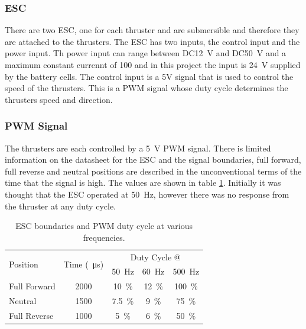 		\subsubsection{ESC}
		There are two ESC, one for each thruster and are submersible and therefore they are attached to the thrusters. The ESC has two inputs, the control input and the power input. Th power input can range between DC\SI{12}{\volt} and DC\SI{50}{\volt} and a maximum constant currennt of \SI{100}{\amp} and in this project the input is \SI{24}{\volt} supplied by the battery cells. The control input is a 5V signal that is used to control the speed of the thrusters. This is a PWM signal whose duty cycle determines the thrusters speed and direction. 
		
		\subsubsection{PWM Signal}
		The thrusters are each controlled by a \SI{5}{\volt} PWM signal. There is limited information on the datasheet for the ESC and the signal boundaries, full forward, full reverse and neutral positions are described in the unconventional terms of the time that the signal is high. The values are shown in table \ref{tab:3:PWM}. Initially it was thought that the ESC operated at \SI{50}{\hertz}, however there was no response from the thruster at any duty cycle.\par
		\begin{table}[!ht]
			\begin{center}
				\caption{ESC boundaries and PWM duty cycle at various frequencies.}
				\label{tab:3:PWM}
				\begin{tabular}{|l|c|c|c|c|}
					\hline
					\multirow{2}{*}{Position} & \multirow{2}{*}{Time (\SI{}{\micro\second})} & \multicolumn{3}{c|}{Duty Cycle @}\\
					& & \multicolumn{1}{c}{\SI{50}{\hertz}} & \multicolumn{1}{c}{\SI{60}{\hertz}} & \multicolumn{1}{c|}{\SI{500}{\hertz}}\\
					\hline
					Full Forward & 2000 & \SI{10}{\percent} & \SI{12}{\percent} & \SI{100}{\percent}  \\
					\hline
					Neutral & 1500 & \SI{7.5}{\percent} & \SI{9}{\percent} & \SI{75}{\percent}  \\
					\hline
					Full Reverse & 1000 & \SI{5}{\percent} & \SI{6}{\percent} & \SI{50}{\percent}  \\
					\hline
				\end{tabular}
			\end{center}
		\end{table}
